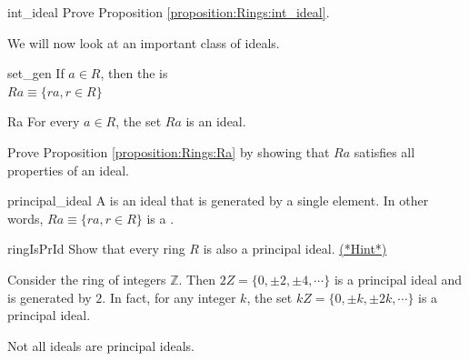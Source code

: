 \begin{exercise}{int_ideal}
Prove Proposition \ref{proposition:Rings:int_ideal}.
\end{exercise}

We will now look at an important class of ideals.

\begin{defn}{set_gen}
If $a\in R$, then the  is \\
$Ra\equiv \{ra, r\in R\}$
\end{defn}

\begin{prop}{Ra}
For every $a\in R$, the set $Ra$ is an ideal.
\end{prop}

\begin{exercise}{}
Prove Proposition \ref{proposition:Rings:Ra} by showing that $Ra$ satisfies all properties of an ideal.
\end{exercise}


\begin{defn}{principal_ideal}
A  is an ideal that is generated by a single element. In other words, $Ra\equiv \{ra,r\in R\}$ is a .
\end{defn}

\begin{exercise}{ringIsPrId}
    Show that every ring $R$ is also a principal ideal. \hyperref[sec:Rings:Hints]{(*Hint*)} 
\end{exercise}

\begin{example}{}
Consider the ring of integers ${\mathbb Z}$. Then $2Z=\{0,\displaystyle \pm 2,\displaystyle \pm 4,\cdots\}$ is a principal ideal and is generated by $2$.  In fact, for any integer $k$, the set  $kZ=\{0,\displaystyle \pm k,\displaystyle \pm 2k,\cdots\}$ is a principal ideal.
\end{example}


Not all ideals are principal ideals.

